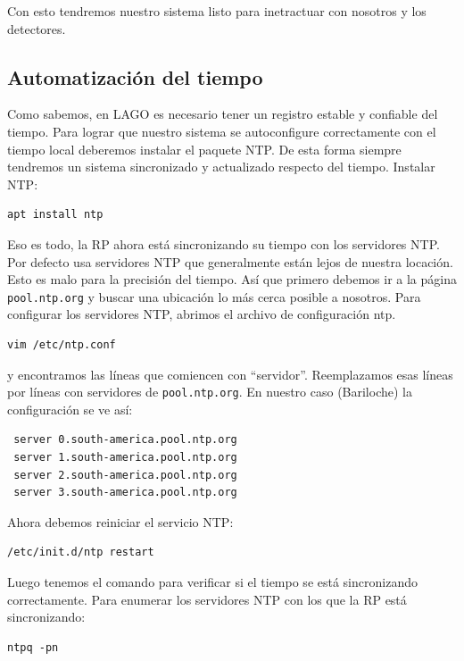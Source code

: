 \documentclass[a4paper,11pt]{article}
\begin{document}
\noindent Con esto tendremos nuestro sistema listo para inetractuar con nosotros
y los detectores.

\subsection{Automatización del tiempo}
Como sabemos, en LAGO es necesario tener un registro estable y confiable del
tiempo. Para lograr que nuestro sistema se autoconfigure correctamente con el
tiempo local deberemos instalar el paquete NTP. De esta forma siempre tendremos
un sistema sincronizado y actualizado respecto del tiempo. Instalar NTP:

\begin{verbatim}
apt install ntp
\end{verbatim}

\noindent Eso es todo, la RP ahora está sincronizando su tiempo con los servidores NTP. Por
defecto usa servidores NTP que generalmente están lejos de nuestra locación.
Esto es malo para la precisión del tiempo. Así que primero debemos ir a la página
\texttt{pool.ntp.org} y buscar una ubicación lo más cerca posible a nosotros.
Para configurar los servidores NTP,
abrimos el archivo de configuración ntp.

\begin{verbatim}
vim /etc/ntp.conf
\end{verbatim}

\noindent y encontramos las líneas que comiencen con ``servidor''. Reemplazamos esas líneas
por líneas con servidores de \texttt{pool.ntp.org}. En nuestro caso (Bariloche)
la configuración se ve así:

\begin{verbatim}
 server 0.south-america.pool.ntp.org
 server 1.south-america.pool.ntp.org
 server 2.south-america.pool.ntp.org
 server 3.south-america.pool.ntp.org
\end{verbatim}

\noindent Ahora debemos reiniciar el servicio NTP:

\begin{verbatim}
/etc/init.d/ntp restart
\end{verbatim}

\noindent Luego tenemos el comando para verificar si el tiempo se está
sincronizando correctamente. Para enumerar los servidores NTP con los que la RP está
sincronizando:

\begin{verbatim}
ntpq -pn
\end{verbatim}
\end{document}
